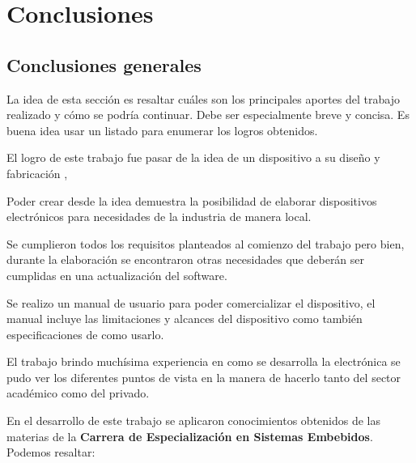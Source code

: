 
\chapter{Conclusiones} %

\label{Chapter5} %




\section{Conclusiones generales }

La idea de esta sección es resaltar cuáles son los principales aportes del trabajo realizado y cómo se podría continuar. Debe ser especialmente breve y concisa. Es buena idea usar un listado para enumerar los logros obtenidos.

El logro de este trabajo fue pasar de la idea de un dispositivo a su diseño y fabricación ,

Poder crear desde la idea demuestra la posibilidad de elaborar dispositivos electrónicos para necesidades de la industria de manera local.

Se cumplieron todos los requisitos planteados al comienzo del trabajo pero bien, durante la elaboración se encontraron otras necesidades que deberán ser cumplidas en una actualización del software.

Se realizo un manual de usuario para poder comercializar el dispositivo, el manual incluye las limitaciones y alcances del dispositivo como también especificaciones de como usarlo.

El trabajo brindo muchísima experiencia en como se desarrolla la electrónica se pudo ver los diferentes puntos de vista en la manera de hacerlo tanto del sector académico como del privado.

En el desarrollo de este trabajo se aplicaron conocimientos obtenidos de las materias de la \textbf{Carrera de Especialización en Sistemas Embebidos}. Podemos resaltar:

